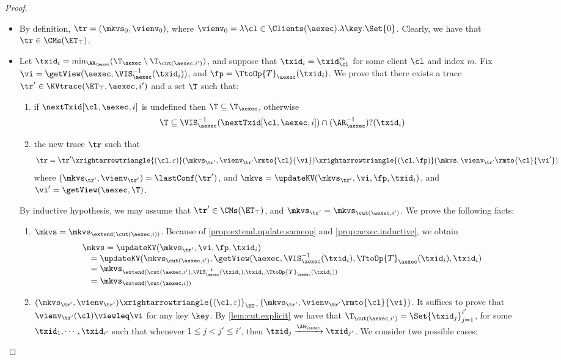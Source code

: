 \begin{proof}
\begin{itemize}
\item {} By definition, $\tr = (\mkvs_{0}, \vienv_{0})$, 
where $\vienv_{0} = \lambda \cl \in \Clients(\aexec). \lambda \key.\Set{0}$. 
Clearly, we have that $\tr \in \CMs(\ET_{\top})$. 
\item {} Let $\txid_{i} = \min_{\AR_{\aexec}}(\T_{\aexec} \setminus \T_{\cut(\aexec, i')})$, 
and suppose that $\txid_{i} = \txid_{\cl}^{m}$ for some client $\cl$ and index $m$. 
Fix $\vi = \getView(\aexec, \VIS_{\aexec}^{-1}(\txid_{i}))$, and  $\fp = \TtoOp{T}_{\aexec}(\txid_{i})$.
We prove that there exists a trace $\tr' \in \KVtrace(\ET_{\top}, \aexec, i')$ and a set 
$\T$ such that: 
\begin{enumerate}
\item if $\nextTxid[\cl, \aexec, i]$ is undefined then $\T \subseteq \T_{\aexec}$, otherwise 
\[
    \T \subseteq \VIS^{-1}_{\aexec}(\nextTxid[\cl, \aexec, i]) \cap (\AR_{\aexec}^{-1})?(\txid_{i})
\]
\item the new trace \( \tr \) such that
\[
\tr = \tr' \xrightarrowtriangle{(\cl, \varepsilon)} (\mkvs_{\tr'}, \vienv_{\tr'}\rmto{\cl}{\vi}) \xrightarrowtriangle{(\cl, \fp)} 
(\mkvs,  \vienv_{\tr'}\rmto{\cl}{\vi'})
\]
where $(\mkvs_{\tr'}, \vienv_{\tr'}) = \lastConf(\tr')$, and $\mkvs = \updateKV(\mkvs_{\tr'}, \vi, \fp, \txid_{i})$, 
and $\vi' = \getView(\aexec, \T)$.
\end{enumerate}
By inductive hypothesis, we may assume that $\tr' \in \CMs(\ET_{\top})$, and $\mkvs_{\tr'} = \mkvs_{\cut(\aexec, i')}$. 
We prove the following facts: 
\begin{enumerate}
\item $\mkvs = \mkvs_{\extend(\cut(\aexec, i))}$. 
Because of \cref{prop:extend.update.sameop} and \cref{prop:aexec.inductive},
we obtain 
\[
\begin{array}{l}
\mkvs = \updateKV(\mkvs_{\tr'}, \vi, \fp, \txid_{i}) \\
\quad = \updateKV(\mkvs_{\cut(\aexec, i')}, \getView(\aexec, \VIS^{-1}_{\aexec}(\txid_{i}), \TtoOp{T}_{\aexec}(\txid_{i}), \txid_{i}) \\
\quad = \mkvs_{\extend(\cut(\aexec, i'), \VIS^{-1}_{\aexec}(\txid_{i}), \txid_{i}, \TtoOp{T}_{\aexec}(\txid_{i})) } \\
\quad = \mkvs_{\extend(\cut(\aexec, i))}
\end{array}
\]

\item $(\mkvs_{\tr'}, \vienv_{\tr'}) \xrightarrowtriangle{(\cl, \varepsilon)}_{\ET_{\top}} (\mkvs_{\tr'}, \vienv_{\tr'}\rmto{\cl}{\vi})$. 
It suffices to prove that $\vienv_{\tr'}(\cl) \viewleq \vi$ for any key $\key$.
By \cref{lem:cut.explicit} we have that $\T_{\cut(\aexec, i')} = \Set{\txid_{j}}_{j=1}^{i'}$, for 
some $\txid_{1},\cdots, \txid_{i'}$ such that whenever $1 \leq j < j' \leq i'$, then 
$\txid_{j} \xrightarrow{\AR_{\aexec}} \txid_{j'}$. We consider two possible cases: 


\end{enumerate}
\end{itemize}
\end{proof}
